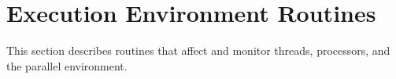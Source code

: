 %
%
%
%
%
%
%
%
%
%
%
%
%


\section{Execution Environment Routines}
\label{sec:Execution Environment Routines}
This section describes routines that affect and monitor threads, processors, and the 
parallel environment. 






